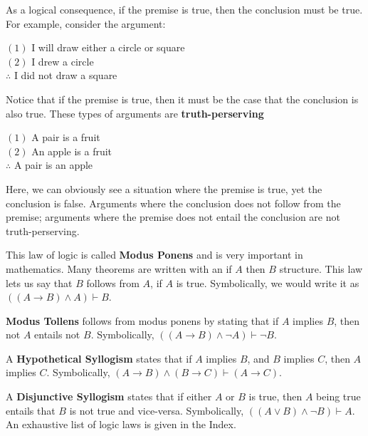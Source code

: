 \documentclass[12pt]{report}
\begin{document}
As a logical consequence, if the premise is true, then the conclusion must be true. For example, consider the argument:
\begin{center}
    $(1)$ I will draw either a circle or square\\
    $(2)$ I drew a circle\\
    $\therefore$ I did not draw a square
\end{center}
Notice that if the premise is true, then it must be the case that the conclusion is also true. These types of arguments are \textbf{truth-perserving}
\begin{center}
    $(1)$ A pair is a fruit\\
    $(2)$ An apple is a fruit\\
    $\therefore$ A pair is an apple
\end{center}
Here, we can obviously see a situation where the premise is true, yet the conclusion is false. Arguments where the conclusion does not follow from the premise; arguments where the premise does not entail the conclusion are not truth-perserving.

This law of logic is called \textbf{Modus Ponens} and is very important in mathematics. Many theorems are written with an if $A$ then $B$ structure. This law lets us say that $B$ follows from $A$, if $A$ is true. Symbolically, we would write it as $((A \rightarrow B) \wedge A) \vdash B$.

\textbf{Modus Tollens} follows from modus ponens by stating that if $A$ implies $B$, then not $A$ entails not $B$. Symbolically, $((A \rightarrow B) \wedge \neg{A}) \vdash \neg{B}$.

A \textbf{Hypothetical Syllogism} states that if $A$ implies $B$, and $B$ implies $C$, then $A$ implies $C$. Symbolically, $(A \rightarrow B) \wedge (B \rightarrow C) \vdash (A \rightarrow C)$.

A \textbf{Disjunctive Syllogism} states that if either $A$ or $B$ is true, then $A$ being true entails that $B$ is not true and vice-versa. Symbolically, $((A \vee B) \wedge \neg{B}) \vdash A$. An exhaustive list of logic laws is given in the Index.
\end{document}
